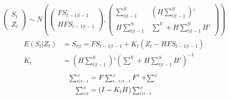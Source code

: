 \documentclass{beamer}
\begin{document}
\begin{frame}
  \begin{align}
    \begin{pmatrix}      S_t \\ Z_t     \end{pmatrix} \sim N \left( 
    \begin{pmatrix}      FS_{t-1|t-1} \\HFS_{t-1|t-1}    \end{pmatrix},
    \begin{pmatrix}      \sum^S_{t|t-1} & \left( H\sum^S_{t|t-1} \right)' \\ H\sum^S_{t|t-1} & \sum^V+H\sum^S_{t|t-1}H' \end{pmatrix} \right)
  \end{align}
  \begin{align}
    E(S_t|Z_t)&=S_{t|t}=FS_{t-1|t-1}+K_t(Z_t-HFS_{t-1|t-1}) \\
    K_t&= \left(H\scriptstyle \sum^S_{t|t-1} \right)' (\scriptstyle \sum^V + H\scriptstyle \sum^S_{t|t-1} \textstyle H')^{-1} 
  \end{align}
  \begin{align}
    \scriptstyle \sum^S_{t|t-1} \textstyle &= F\scriptstyle \sum^S_{t-1|t-1}\textstyle F'+ \scriptstyle\sum^U\\
    \scriptstyle \sum^S_{t|t} \textstyle &= (I-K_tH)\scriptstyle \sum^S_{t|t-1}
  \end{align}
\end{frame}




\end{document}
